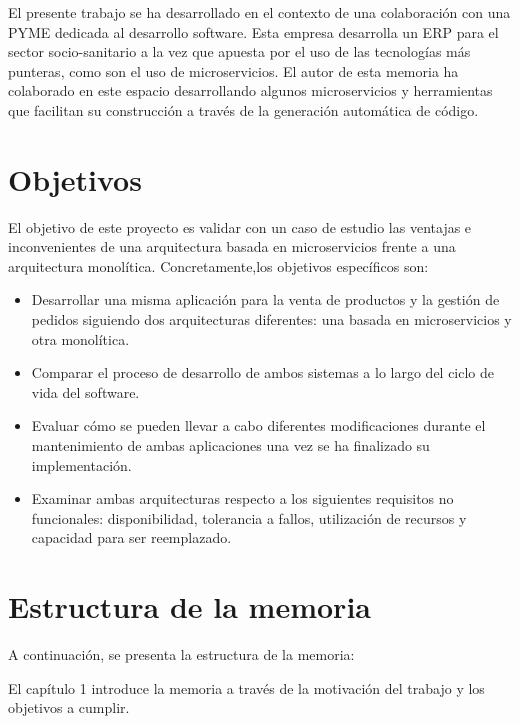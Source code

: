 \documentclass[11pt,spanish,listoffigures]{tfgetsinf}
\begin{document}
El presente trabajo se ha desarrollado en el contexto de una colaboración con una PYME dedicada al desarrollo software. Esta empresa desarrolla un ERP para el sector socio-sanitario a la vez que apuesta por el uso de las tecnologías más punteras, como son el uso de microservicios. El autor de esta memoria ha colaborado en este espacio desarrollando algunos microservicios y herramientas que facilitan su construcción a través de la generación automática de código.

\section{Objetivos}

El objetivo de este proyecto es validar con un caso de estudio las ventajas e inconvenientes de una arquitectura basada en microservicios frente a una arquitectura monolítica. Concretamente,los objetivos específicos son:

\begin{itemize}

\item Desarrollar una misma aplicación para la venta de productos y la gestión de pedidos siguiendo dos arquitecturas diferentes: una basada en microservicios y otra monolítica.

\item Comparar el proceso de desarrollo de ambos sistemas a lo largo del ciclo de vida del software.

\item Evaluar cómo se pueden llevar a cabo diferentes modificaciones durante el mantenimiento de ambas aplicaciones una vez se ha finalizado su implementación.

\item Examinar ambas arquitecturas respecto a los siguientes requisitos no funcionales: disponibilidad, tolerancia a fallos, utilización de recursos y capacidad para ser reemplazado.

\end{itemize}

\section{Estructura de la memoria}

A continuación, se presenta la estructura de la memoria:

El capítulo 1 introduce la memoria a través de la motivación del trabajo y los objetivos a cumplir.
\end{document}
